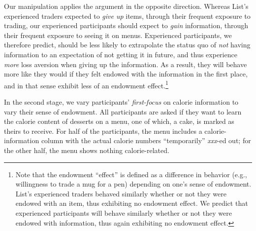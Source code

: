 \documentclass[12pt]{article}
\begin{document}
Our manipulation applies the argument in the opposite direction. Whereas List’s experienced traders expected to \emph{give up} items, through their frequent exposure to trading, our experienced participants should expect to \emph{gain} information, through their frequent exposure to seeing it on menus. Experienced participants, we therefore predict, should be less likely to extrapolate the status quo of \emph{not} having information to an expectation of not getting it in future, and thus experience \emph{more} loss aversion when giving up the information. As a result, they will behave more like they would if they felt endowed with the information in the first place, and in that sense exhibit less of an endowment effect.\footnote{Note that the endowment \enquote{effect} is defined as a difference in behavior (e.g., willingness to trade a mug for a pen) depending on one’s sense of endowment. List’s experienced traders behaved similarly whether or not they were endowed with an item, thus exhibiting no endowment effect. We predict that experienced participants will behave similarly whether or not they were endowed with information, thus again exhibiting no endowment effect.}

In the second stage, we vary participants' \emph{first-focus} on calorie information to vary their sense of endowment. All participants are asked if they want to learn the calorie content of desserts on a menu, one of which, a cake, is marked as theirs to receive. For half of the participants, the menu includes a calorie-information column with the actual calorie numbers \enquote{temporarily} \emph{xxx}-ed out; for the other half, the menu shows nothing calorie-related.
\end{document}

